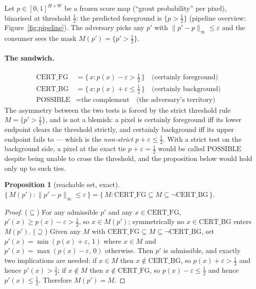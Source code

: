 \documentclass[10pt]{article}
\newcommand{\CFG}{\mathrm{CERT\_FG}}
\newcommand{\CBG}{\mathrm{CERT\_BG}}
\newcommand{\POSS}{\mathrm{POSSIBLE}}
\newcommand{\eps}{\varepsilon}
\newtheorem{proposition}{Proposition}
\begin{document}
Let $p \in [0,1]^{H\times W}$ be a frozen score map (``grout
probability'' per pixel), binarised at threshold $\tfrac12$: the predicted
foreground is $\{p > \tfrac12\}$ (pipeline overview:
Figure~\ref{fig:pipeline}). The adversary picks any $p'$ with
$\|p'-p\|_\infty \le \eps$ and the consumer sees the mask
$M(p') = \{p' > \tfrac12\}$.

\paragraph{The sandwich.}
\begin{align*}
\CFG  &= \{\,x : p(x)-\eps > \tfrac12\,\} \quad\text{(certainly foreground)}\\
\CBG  &= \{\,x : p(x)+\eps \le \tfrac12\,\} \quad\text{(certainly background)}\\
\POSS &= \text{the complement} \quad\text{(the adversary's territory)}
\end{align*}
The asymmetry between the two tests is forced by the strict threshold rule
$M=\{p' > \tfrac12\}$, and is not a blemish: a pixel is certainly
foreground iff its lower endpoint clears the threshold strictly, and
certainly background iff its upper endpoint fails to --- which is the
\emph{non-strict} $p+\eps \le \tfrac12$. With a strict test on the
background side, a pixel at the exact tie $p+\eps=\tfrac12$ would be
called $\POSS$ despite being unable to cross the threshold, and the
proposition below would hold only up to such ties.

\begin{proposition}[reachable set, exact]\label{prop:sandwich}
$\{\,M(p') : \|p'-p\|_\infty \le \eps\,\}
 = \{\,M : \CFG \subseteq M \subseteq \lnot\CBG\,\}$.
\end{proposition}
\begin{proof}
($\subseteq$) For any admissible $p'$ and any $x \in \CFG$,
$p'(x) \ge p(x)-\eps > \tfrac12$, so $x \in M(p')$; symmetrically no
$x \in \CBG$ enters $M(p')$. ($\supseteq$) Given any $M$ with
$\CFG \subseteq M \subseteq \lnot\CBG$, set
$p'(x)=\min(p(x)+\eps,\,1)$ where $x \in M$ and
$p'(x)=\max(p(x)-\eps,\,0)$ otherwise. Then $p'$ is admissible, and
exactly two implications are needed: if $x \in M$ then $x \notin \CBG$,
so $p(x)+\eps > \tfrac12$ and hence $p'(x) > \tfrac12$; if
$x \notin M$ then $x \notin \CFG$, so $p(x)-\eps \le \tfrac12$ and
hence $p'(x) \le \tfrac12$. Therefore $M(p')=M$.
\end{proof}
\end{document}
